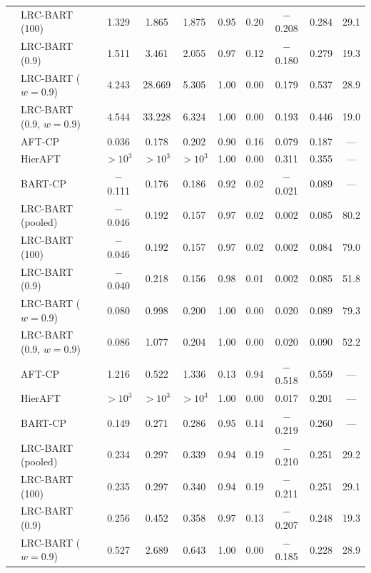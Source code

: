 \begin{center}
\begin{longtable}{llcccccccc}
& LRC-BART (100) & 1.329 & 1.865 & 1.875 & 0.95 & 0.20 & $-$0.208 & 0.284 & 29.1 \\
& LRC-BART (0.9) & 1.511 & 3.461 & 2.055 & 0.97 & 0.12 & $-$0.180 & 0.279 & 19.3 \\
& LRC-BART ($w=0.9$) & 4.243 & 28.669 & 5.305 & 1.00 & 0.00 & 0.179 & 0.537 & 28.9 \\
& LRC-BART (0.9, $w=0.9$) & 4.544 & 33.228 & 6.324 & 1.00 & 0.00 & 0.193 & 0.446 & 19.0 \\
\midrule
{} & AFT-CP & 0.036 & 0.178 & 0.202 & 0.90 & 0.16 & 0.079 & 0.187 & --- \\
& HierAFT & $>\!10^{3}$ & $>\!10^{3}$ & $>\!10^{3}$ & 1.00 & 0.00 & 0.311 & 0.355 & --- \\
& BART-CP & $-$0.111 & 0.176 & 0.186 & 0.92 & 0.02 & $-$0.021 & 0.089 & --- \\
& LRC-BART (pooled) & $-$0.046 & 0.192 & 0.157 & 0.97 & 0.02 & 0.002 & 0.085 & 80.2 \\
& LRC-BART (100) & $-$0.046 & 0.192 & 0.157 & 0.97 & 0.02 & 0.002 & 0.084 & 79.0 \\
& LRC-BART (0.9) & $-$0.040 & 0.218 & 0.156 & 0.98 & 0.01 & 0.002 & 0.085 & 51.8 \\
& LRC-BART ($w=0.9$) & 0.080 & 0.998 & 0.200 & 1.00 & 0.00 & 0.020 & 0.089 & 79.3 \\
& LRC-BART (0.9, $w=0.9$) & 0.086 & 1.077 & 0.204 & 1.00 & 0.00 & 0.020 & 0.090 & 52.2 \\
\midrule
{} & AFT-CP & 1.216 & 0.522 & 1.336 & 0.13 & 0.94 & $-$0.518 & 0.559 & --- \\
& HierAFT & $>\!10^{3}$ & $>\!10^{3}$ & $>\!10^{3}$ & 1.00 & 0.00 & 0.017 & 0.201 & --- \\
& BART-CP & 0.149 & 0.271 & 0.286 & 0.95 & 0.14 & $-$0.219 & 0.260 & --- \\
& LRC-BART (pooled) & 0.234 & 0.297 & 0.339 & 0.94 & 0.19 & $-$0.210 & 0.251 & 29.2 \\
& LRC-BART (100) & 0.235 & 0.297 & 0.340 & 0.94 & 0.19 & $-$0.211 & 0.251 & 29.1 \\
& LRC-BART (0.9) & 0.256 & 0.452 & 0.358 & 0.97 & 0.13 & $-$0.207 & 0.248 & 19.3 \\
& LRC-BART ($w=0.9$) & 0.527 & 2.689 & 0.643 & 1.00 & 0.00 & $-$0.185 & 0.228 & 28.9 \\

\end{longtable}
\end{center}
